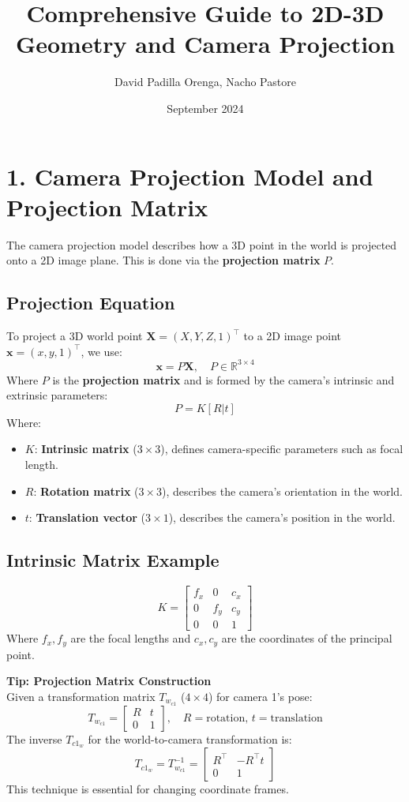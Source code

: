 \documentclass[a4paper,10pt]{article}
\title{Comprehensive Guide to 2D-3D Geometry and Camera Projection}
\author{David Padilla Orenga, Nacho Pastore}
\date{September 2024}
\begin{document}
\maketitle

\section*{1. Camera Projection Model and Projection Matrix}

The camera projection model describes how a 3D point in the world is projected onto a 2D image plane. This is done via the \textbf{projection matrix} $P$.

\subsection*{Projection Equation}
To project a 3D world point $\mathbf{X} = (X, Y, Z, 1)^\top$ to a 2D image point $\mathbf{x} = (x, y, 1)^\top$, we use:
\[
\mathbf{x} = P \mathbf{X}, \quad P \in \mathbb{R}^{3 \times 4}
\]
Where $P$ is the \textbf{projection matrix} and is formed by the camera's intrinsic and extrinsic parameters:
\[
P = K [R | t]
\]
Where:
\begin{itemize}
    \item $K$: \textbf{Intrinsic matrix} ($3 \times 3$), defines camera-specific parameters such as focal length.
    \item $R$: \textbf{Rotation matrix} ($3 \times 3$), describes the camera's orientation in the world.
    \item $t$: \textbf{Translation vector} ($3 \times 1$), describes the camera's position in the world.
\end{itemize}

\subsection*{Intrinsic Matrix Example}
\[
K = \begin{bmatrix} f_x & 0 & c_x \\ 0 & f_y & c_y \\ 0 & 0 & 1 \end{bmatrix}
\]
Where $f_x, f_y$ are the focal lengths and $c_x, c_y$ are the coordinates of the principal point.

\textbf{Tip: Projection Matrix Construction} \\
Given a transformation matrix $T_{w_{c1}}$ ($4 \times 4$) for camera 1’s pose:
\[
T_{w_{c1}} = \begin{bmatrix} R & t \\ 0 & 1 \end{bmatrix}, \quad R = \text{rotation}, \, t = \text{translation}
\]
The inverse $T_{c1_w}$ for the world-to-camera transformation is:
\[
T_{c1_w} = T_{w_{c1}}^{-1} = \begin{bmatrix} R^\top & -R^\top t \\ 0 & 1 \end{bmatrix}
\]
This technique is essential for changing coordinate frames.
\end{document}
